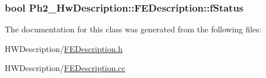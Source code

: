 \hypertarget{class_ph2___hw_description_1_1_f_e_description_a646f651eb15f15a519006eca502e3418}{
\subsubsection[{f\-Status}]{\setlength{\rightskip}{0pt plus 5cm}bool Ph2\-\_\-\-Hw\-Description\-::\-F\-E\-Description\-::f\-Status}}\label{class_ph2___hw_description_1_1_f_e_description_a646f651eb15f15a519006eca502e3418}


The documentation for this class was generated from the following files\-:\begin{DoxyCompactItemize}
\item 
H\-W\-Description/\hyperlink{_f_e_description_8h}{F\-E\-Description.\-h}\item 
H\-W\-Description/\hyperlink{_f_e_description_8cc}{F\-E\-Description.\-cc}\end{DoxyCompactItemize}
